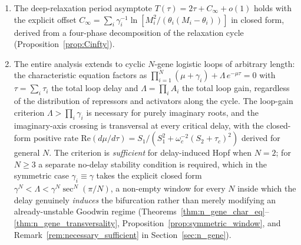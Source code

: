 \documentclass[sn-mathphys,Numbered]{sn-jnl}
\theoremstyle{thmstyleone}
\theoremstyle{thmstyletwo}
\theoremstyle{thmstylethree}
\begin{document}
\begin{enumerate}
        loop $\theta_i=M_i/2$ supercriticality is moreover
        \emph{proved} in closed form by a Lindstedt--Poincar\'e
        reduction (Theorem~\ref{thm:supercritical}), which yields the
        explicit amplitude law $A_1=(4\omega_c/\lambda)
        [S_1/((1+|q_2|^2)(S_2+\tau_c))]^{1/2}\sqrt{\tau-\tau_c}$ and a
        matching frequency law, valid for every parameter choice in the
        strong-feedback region. For the \emph{general asymmetric} loop
        the same reduction is carried through to a closed-form first
        Lyapunov coefficient: the order-$\varepsilon^3$ solvability
        condition collapses to a single complex equation whose real and
        imaginary parts fix the criticality coefficient $\mathcal{T}$ and
        the frequency correction $\Omega_2$, with $\mathcal{T}>0$
        characterising supercriticality (Theorem~\ref{thm:general_lyapunov}). The
        prediction is validated externally: calibrated to measured
        p53--Mdm2 degradation rates and transcriptional delay, the
        closed-form Hopf period reproduces the observed $\sim5.5$~h
        oscillation to within $3\%$, and the Hopf locus agrees with the
        standard Hill-function model to within a few percent
        (Section~\ref{sec:bio_validation}).
  \item The deep-relaxation period asymptote
        $T(\tau)=2\tau+C_\infty+o(1)$ holds with the explicit offset
        $C_\infty=\sum_i\gamma_i^{-1}\ln[M_i^2/(\theta_i(M_i-\theta_i))]$
        in closed form, derived from a four-phase decomposition of the
        relaxation cycle (Proposition~\ref{prop:Cinfty}).
  \item The entire analysis extends to cyclic $N$-gene logistic loops
        of arbitrary length: the characteristic equation factors as
        $\prod_{i=1}^N(\mu+\gamma_i)+\Lambda\,e^{-\mu\tau}=0$ with
        $\tau=\sum_i\tau_i$ the total loop delay and
        $\Lambda=\prod_i A_i$ the total loop gain, regardless of the
        distribution of repressors and activators along the cycle.
        The loop-gain criterion $\Lambda>\prod_i\gamma_i$ is necessary
        for purely imaginary roots, and the imaginary-axis crossing is
        transversal at every critical delay, with the closed-form
        positive rate $\mathrm{Re}(d\mu/d\tau)=S_1/(S_1^2+\omega_c^{-2}
        (S_2+\tau_c)^2)$ derived for general $N$. The criterion is
        \emph{sufficient} for delay-induced Hopf when $N=2$; for
        $N\geq 3$ a separate no-delay stability condition is required,
        which in the symmetric case $\gamma_i\equiv\gamma$ takes the
        explicit closed form $\gamma^N<\Lambda<\gamma^N\sec^N(\pi/N)$,
        a non-empty window for every $N$ inside which the delay
        genuinely \emph{induces} the bifurcation rather than merely
        modifying an already-unstable Goodwin regime
        (Theorems~\ref{thm:n_gene_char_eq}--\ref{thm:n_gene_transversality},
        Proposition~\ref{prop:symmetric_window}, and
        Remark~\ref{rem:necessary_sufficient} in
        Section~\ref{sec:n_gene}).
\end{enumerate}
\end{document}
